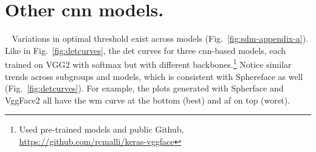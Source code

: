 %
\newpage
\onecolumn
\renewcommand{\thesection}{\alph{section}}
\glsresetall
\setcounter{section}{0}

\section{Other \gls{cnn} models.}~\label{app:sec:other:models}
Variations in optimal threshold exist across models (Fig.~\ref{fig:sdm-appendix-a}). Like in Fig.~\ref{fig:detcurves}, the \gls{det} curves for three \gls{cnn}-based models, each trained on VGG2 with softmax but with different backbones.\footnote{Used pre-trained models and public Github, \href{https://github.com/rcmalli/keras-vggface}{https://github.com/rcmalli/keras-vggface}} Notice similar trends across subgroups and models, which is consistent with  Sphereface as well (Fig.~\ref{fig:detcurves}). For example, the plots generated with Spherface and VggFace2 all have the \gls{wm} curve at the bottom (\ie best) and \gls{af} on top (\ie worst). 


